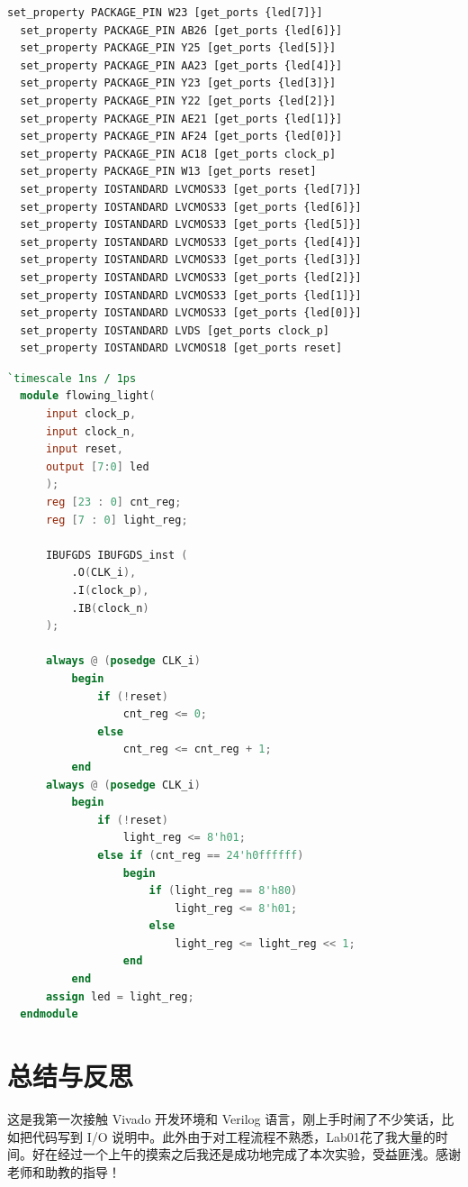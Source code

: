 \documentclass{progartcn}
\begin{document}
\begin{lstlisting}[caption={lab01\_xdc.xdc},label={cd:4}]
  set_property PACKAGE_PIN W23 [get_ports {led[7]}]
  set_property PACKAGE_PIN AB26 [get_ports {led[6]}]
  set_property PACKAGE_PIN Y25 [get_ports {led[5]}]
  set_property PACKAGE_PIN AA23 [get_ports {led[4]}]
  set_property PACKAGE_PIN Y23 [get_ports {led[3]}]
  set_property PACKAGE_PIN Y22 [get_ports {led[2]}]
  set_property PACKAGE_PIN AE21 [get_ports {led[1]}]
  set_property PACKAGE_PIN AF24 [get_ports {led[0]}]
  set_property PACKAGE_PIN AC18 [get_ports clock_p]
  set_property PACKAGE_PIN W13 [get_ports reset]
  set_property IOSTANDARD LVCMOS33 [get_ports {led[7]}]
  set_property IOSTANDARD LVCMOS33 [get_ports {led[6]}]
  set_property IOSTANDARD LVCMOS33 [get_ports {led[5]}]
  set_property IOSTANDARD LVCMOS33 [get_ports {led[4]}]
  set_property IOSTANDARD LVCMOS33 [get_ports {led[3]}]
  set_property IOSTANDARD LVCMOS33 [get_ports {led[2]}]
  set_property IOSTANDARD LVCMOS33 [get_ports {led[1]}]
  set_property IOSTANDARD LVCMOS33 [get_ports {led[0]}]
  set_property IOSTANDARD LVDS [get_ports clock_p]
  set_property IOSTANDARD LVCMOS18 [get_ports reset]
\end{lstlisting}

\begin{lstlisting}[language=verilog,caption={flowing\_light.v最终代码},label={cd:5}]
  `timescale 1ns / 1ps
  module flowing_light(
      input clock_p,
      input clock_n,
      input reset,
      output [7:0] led
      );
      reg [23 : 0] cnt_reg;
      reg [7 : 0] light_reg;
      
      IBUFGDS IBUFGDS_inst (
          .O(CLK_i),
          .I(clock_p),
          .IB(clock_n)
      );
      
      always @ (posedge CLK_i)
          begin
              if (!reset)
                  cnt_reg <= 0;
              else
                  cnt_reg <= cnt_reg + 1;
          end
      always @ (posedge CLK_i)
          begin
              if (!reset)
                  light_reg <= 8'h01;
              else if (cnt_reg == 24'h0ffffff)
                  begin
                      if (light_reg == 8'h80)
                          light_reg <= 8'h01;
                      else
                          light_reg <= light_reg << 1;
                  end
          end
      assign led = light_reg;
  endmodule
\end{lstlisting}

\section{总结与反思}

这是我第一次接触 Vivado 开发环境和 Verilog 语言，刚上手时闹了不少笑话，比如把代码写到 I/O 说明中。此外由于对工程流程不熟悉，Lab01花了我大量的时间。好在经过一个上午的摸索之后我还是成功地完成了本次实验，受益匪浅。感谢老师和助教的指导！
\end{document}
